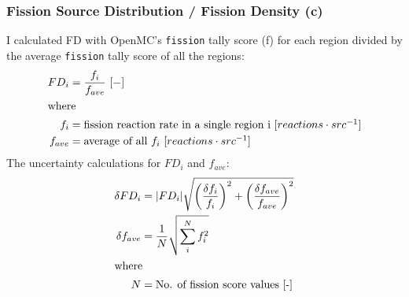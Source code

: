\subsubsection{Fission Source Distribution / Fission Density (c)}
I calculated \gls{FD} with OpenMC's \texttt{fission} tally score (f) 
for each region divided by the average \texttt{fission} tally score of all the regions:
\begin{align}
    FD_i &=  \frac{f_i}{f_{ave}}\ [-]\\
    \intertext{where}
    f_i &= \mbox{fission reaction rate in a single region i [$reactions \cdot src^{-1}$]} \nonumber \\
    f_{ave} &= \mbox{average of all $f_i$ [$reactions \cdot src^{-1}$]} \nonumber
\end{align}
The uncertainty calculations for $FD_i$ and $f_{ave}$: 
\begin{align}
    \delta FD_i &= |FD_i| \sqrt{\left(\frac{\delta f_i}{f_i}\right)^2+\left(\frac{\delta f_{ave}}{f_{ave}}\right)^2} \\
    \delta f_{ave} &= \frac{1}{N}\sqrt{\sum_i^Nf_i^2} \\
    \intertext{where}
    N &= \mbox{No. of fission score values [-]} \nonumber
\end{align}


